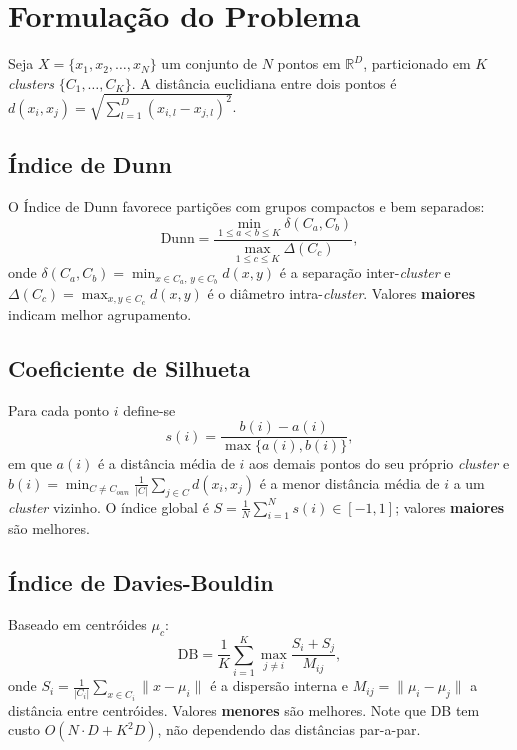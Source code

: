 \documentclass[12pt]{article}
\begin{document}
\section{Formulação do Problema}

Seja $X = \{x_1, x_2, \dots, x_N\}$ um conjunto de $N$ pontos em
$\mathbb{R}^D$, particionado em $K$ \emph{clusters}
$\{C_1, \dots, C_K\}$. A distância euclidiana entre dois pontos é
$d(x_i,x_j) = \sqrt{\sum_{l=1}^{D}(x_{i,l}-x_{j,l})^2}$.

\subsection{Índice de Dunn}
O Índice de Dunn favorece partições com grupos compactos e bem separados:
\begin{equation}
\mathrm{Dunn} =
\frac{\min_{1 \le a < b \le K} \delta(C_a, C_b)}
     {\max_{1 \le c \le K} \Delta(C_c)},
\end{equation}
onde $\delta(C_a,C_b) = \min_{x \in C_a,\, y \in C_b} d(x,y)$ é a separação
inter-\emph{cluster} e $\Delta(C_c) = \max_{x,y \in C_c} d(x,y)$ é o
diâmetro intra-\emph{cluster}. Valores \textbf{maiores} indicam melhor
agrupamento.

\subsection{Coeficiente de Silhueta}
Para cada ponto $i$ define-se
\begin{equation}
s(i) = \frac{b(i) - a(i)}{\max\{a(i), b(i)\}},
\end{equation}
em que $a(i)$ é a distância média de $i$ aos demais pontos do seu próprio
\emph{cluster} e $b(i) = \min_{C \neq C_{own}} \frac{1}{|C|}\sum_{j\in C}
d(x_i,x_j)$ é a menor distância média de $i$ a um \emph{cluster} vizinho. O
índice global é $S = \frac{1}{N}\sum_{i=1}^{N} s(i) \in [-1,1]$; valores
\textbf{maiores} são melhores.

\subsection{Índice de Davies-Bouldin}
Baseado em centróides $\mu_c$:
\begin{equation}
\mathrm{DB} = \frac{1}{K}\sum_{i=1}^{K}
\max_{j \neq i}\frac{S_i + S_j}{M_{ij}},
\end{equation}
onde $S_i = \frac{1}{|C_i|}\sum_{x\in C_i}\|x-\mu_i\|$ é a dispersão interna e
$M_{ij}=\|\mu_i-\mu_j\|$ a distância entre centróides. Valores
\textbf{menores} são melhores. Note que DB tem custo $O(N\cdot D + K^2 D)$,
não dependendo das distâncias par-a-par.
\end{document}
